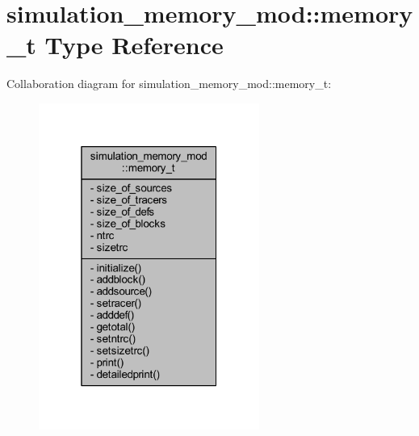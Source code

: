 \hypertarget{structsimulation__memory__mod_1_1memory__t}{}\section{simulation\+\_\+memory\+\_\+mod\+:\+:memory\+\_\+t Type Reference}
\label{structsimulation__memory__mod_1_1memory__t}


Collaboration diagram for simulation\+\_\+memory\+\_\+mod\+:\+:memory\+\_\+t\+:\nopagebreak
\begin{figure}[H]
\begin{center}
\leavevmode
\includegraphics[width=205pt]{structsimulation__memory__mod_1_1memory__t__coll__graph}
\end{center}
\end{figure}
